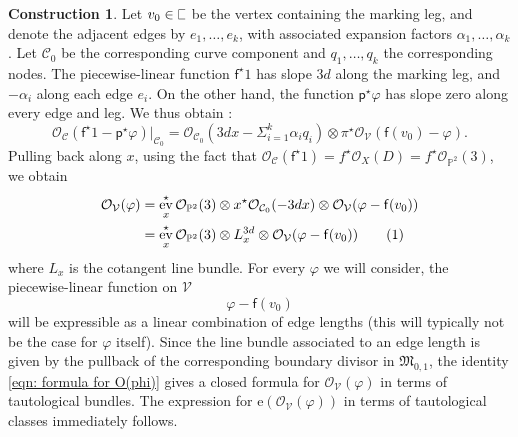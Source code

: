 \documentclass[11pt]{amsart}
\theoremstyle{definition}
\theoremstyle{definition}
\newtheorem{construction}[theorem]{Construction}
\DeclareMathOperator{\ev}{ev}
\newcommand{\sqC}{\scalebox{0.8}[1.2]{$\sqsubset$}}
\newcommand{\e}{\mathrm{e}}
\newcommand{\PP}{\mathbb{P}}
\newcommand{\OO}{\mathcal{O}}
\newcommand{\Ccal}{\mathcal{C}}
\newcommand{\Mfrak}{\mathfrak{M}}
\begin{document}
\begin{construction}
Let $v_0 \in \sqC$ be the vertex containing the marking leg, and denote the adjacent edges by $e_1,\ldots,e_k$, with associated expansion factors $\alpha_{1},\ldots,\alpha_k$. Let $\Ccal_0$ be the corresponding curve component and $q_1,\ldots,q_k$ the corresponding nodes. The piecewise-linear function $\mathsf{f}^\star 1$ has slope $3d$ along the marking leg, and $-\alpha_{i}$ along each edge $e_i$. On the other hand, the function $\mathsf{p}^\star \varphi$ has slope zero along every edge and leg. We thus obtain \cite[Proposition 2.4.1]{RanganathanSantosParkerWise1}:
\begin{equation}\label{eqn: tropical bundles on C} \OO_{\Ccal}( \mathsf{f}^\star 1 - \mathsf{p}^\star \varphi)|_{\Ccal_0} = \OO_{\Ccal_0}(3d x - \Sigma_{i=1}^k \alpha_i q_i) \otimes \pi^\star \OO_{\mathcal{V}}(\mathsf{f}(v_0) - \varphi).\end{equation}
Pulling back along $x$, using the fact that $\OO_{\Ccal}(\mathsf{f}^\star 1) = f^\star \OO_{X}(D) = f^\star \OO_{\PP^2}(3)$, we obtain
\begin{align*} \OO_{\mathcal{V}}(\varphi) & = \ev_x^\star \OO_{\PP^2}(3) \otimes x^\star \OO_{\Ccal_0}(-3dx) \otimes \OO_{\mathcal{V}}(\varphi - \mathsf{f}(v_0))\\
& = \ev_x^\star \OO_{\PP^2}(3) \otimes L_x^{3d} \otimes \OO_{\mathcal{V}}(\varphi - \mathsf{f}(v_0)) \addtocounter{equation}{1}\tag{\theequation} \label{eqn: formula for O(phi)} \end{align*}
where $L_x$ is the cotangent line bundle. For every $\varphi$ we will consider, the piecewise-linear function on $\mathcal{V}$
\begin{equation*} \varphi-\mathsf{f}(v_0) \end{equation*}
will be expressible as a linear combination of edge lengths (this will typically not be the case for $\varphi$ itself). Since the line bundle associated to an edge length is given by the pullback of the corresponding boundary divisor in $\Mfrak_{0,1}$, the identity \eqref{eqn: formula for O(phi)} gives a closed formula for $\OO_{\mathcal{V}}(\varphi)$ in terms of tautological bundles. The expression for $\e (\OO_{\mathcal{V}}(\varphi))$ in terms of tautological classes immediately follows.\end{construction}
\end{document}
